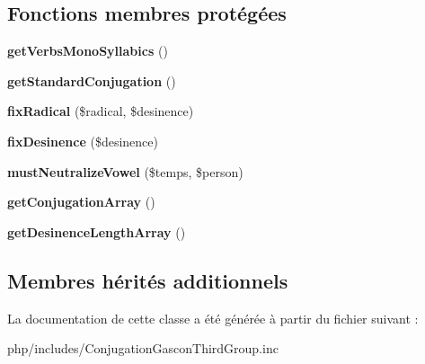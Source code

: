 \subsection*{Fonctions membres protégées}
\begin{DoxyCompactItemize}
\item 
\hypertarget{classConjugationGasconThirdGroup_ae77d3521103e064d1166a896d78938cc}{}\label{classConjugationGasconThirdGroup_ae77d3521103e064d1166a896d78938cc} 
{\bfseries get\+Verbs\+Mono\+Syllabics} ()
\item 
\hypertarget{classConjugationGasconThirdGroup_a5b658699da2a8e2c53406668483816be}{}\label{classConjugationGasconThirdGroup_a5b658699da2a8e2c53406668483816be} 
{\bfseries get\+Standard\+Conjugation} ()
\item 
\hypertarget{classConjugationGasconThirdGroup_a85f7883338561152e0493cf7902cfc75}{}\label{classConjugationGasconThirdGroup_a85f7883338561152e0493cf7902cfc75} 
{\bfseries fix\+Radical} (\$radical, \$desinence)
\item 
\hypertarget{classConjugationGasconThirdGroup_a59ac06a6aa3030d98069f534ddea8398}{}\label{classConjugationGasconThirdGroup_a59ac06a6aa3030d98069f534ddea8398} 
{\bfseries fix\+Desinence} (\$desinence)
\item 
\hypertarget{classConjugationGasconThirdGroup_ab70a4b2011631eb73f3c1e20ee3fe19b}{}\label{classConjugationGasconThirdGroup_ab70a4b2011631eb73f3c1e20ee3fe19b} 
{\bfseries must\+Neutralize\+Vowel} (\$temps, \$person)
\item 
\hypertarget{classConjugationGasconThirdGroup_ab98edff3803ea21806d84b55e99b58fb}{}\label{classConjugationGasconThirdGroup_ab98edff3803ea21806d84b55e99b58fb} 
{\bfseries get\+Conjugation\+Array} ()
\item 
\hypertarget{classConjugationGasconThirdGroup_aca29f03d35cb95b12858698faf6d9a55}{}\label{classConjugationGasconThirdGroup_aca29f03d35cb95b12858698faf6d9a55} 
{\bfseries get\+Desinence\+Length\+Array} ()
\end{DoxyCompactItemize}
\subsection*{Membres hérités additionnels}


La documentation de cette classe a été générée à partir du fichier suivant \+:\begin{DoxyCompactItemize}
\item 
php/includes/Conjugation\+Gascon\+Third\+Group.\+inc\end{DoxyCompactItemize}
